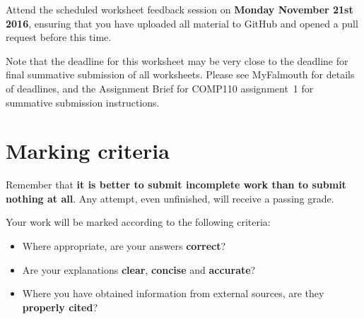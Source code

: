 \documentclass{../../../fal_assignment}
\begin{document}
Attend the scheduled worksheet feedback session on \textbf{Monday November 21st 2016},
ensuring that you have uploaded all material to GitHub and opened a pull request before this time.

Note that the deadline for this worksheet may be very close to the deadline for final summative submission of all worksheets.
Please see MyFalmouth for details of deadlines, and the Assignment Brief for COMP110 assignment~1 for summative submission instructions.

\section*{Marking criteria}

Remember that \textbf{it is better to submit incomplete work than to submit nothing at all}.
Any attempt, even unfinished, will receive a passing grade.

Your work will be marked according to the following criteria:
\begin{itemize}
	\item Where appropriate, are your answers \textbf{correct}?
	\item Are your explanations \textbf{clear}, \textbf{concise} and \textbf{accurate}?
	\item Where you have obtained information from external sources, are they \textbf{properly cited}?
\end{itemize}
\end{document}
